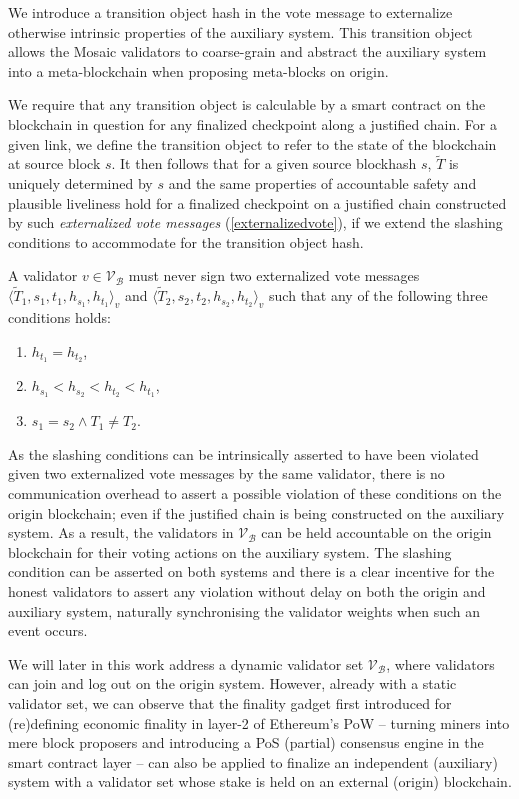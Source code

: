\documentclass[12pt,a4paper]{article}
\begin{document}
We introduce a transition object hash in the vote message to externalize otherwise intrinsic properties of the auxiliary system.
This transition object allows the Mosaic validators to coarse-grain and abstract the auxiliary system into a meta-blockchain when proposing meta-blocks on origin.

We require that any transition object is calculable by a smart contract on the blockchain in question for any finalized checkpoint along a justified chain.
For a given link, we define the transition object to refer to the state of the blockchain at source block $s$.
It then follows that for a given source blockhash $s$, $\tilde{T}$ is uniquely determined by $s$ and the same properties of accountable safety and plausible liveliness hold for a finalized checkpoint on a justified chain constructed by such \emph{externalized vote messages} (\ref{externalizedvote}), if we extend the slashing conditions to accommodate for the transition object hash.

A validator $v \in \mathcal{V}_\mathcal{B}$ must never sign two externalized vote messages $\langle \tilde{T}_1, s_1, t_1, h_{s_1}, h_{t_1}\rangle_v$ and $\langle \tilde{T}_2, s_2, t_2, h_{s_2}, h_{t_2}\rangle_v$ such that any of the following three conditions holds:
\begin{enumerate}
  \item $h_{t_1} = h_{t_2}$,
  \item $h_{s_1} < h_{s_2} < h_{t_2} < h_{t_1}$,
  \item $s_1 = s_2 \land T_1 \neq T_2$.
\end{enumerate}

As the slashing conditions can be intrinsically asserted to have been violated given two externalized vote messages by the same validator, there is no communication overhead to assert a possible violation of these conditions on the origin blockchain; even if the justified chain is being constructed on the auxiliary system.
As a result, the validators in $\mathcal{V}_\mathcal{B}$ can be held accountable on the origin blockchain for their voting actions on the auxiliary system.
The slashing condition can be asserted on both systems and there is a clear incentive for the honest validators to assert any violation without delay on both the origin and auxiliary system, naturally synchronising the validator weights when such an event occurs.

We will later in this work address a dynamic validator set $\mathcal{V}_\mathcal{B}$, where validators can join and log out on the origin system.
However, already with a static validator set, we can observe that the finality gadget first introduced for (re)defining economic finality in layer-2 of Ethereum's PoW -- turning miners into mere block proposers and introducing a PoS (partial) consensus engine in the smart contract layer -- can also be applied to finalize an independent (auxiliary) system with a validator set whose stake is held on an external (origin) blockchain.
\end{document}
